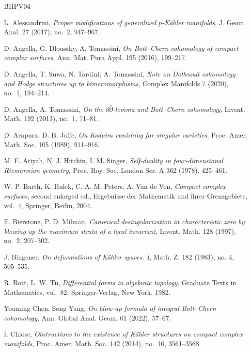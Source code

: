 \documentclass[11pt]{amsart}
\numberwithin{equation}{section}
\theoremstyle{plain}
\theoremstyle{definition}
\begin{document}
\begin{thebibliography}{BHPV04}

L. Alessandrini,
\textit{Proper modifications of generalized $p$-K\"ahler manifolds},
J. Geom. Anal. 27 (2017), no.~2, 947--967.

D. Angella, G. Dloussky, A. Tomassini,
\textit{On Bott--Chern cohomology of compact complex surfaces},
Ann. Mat. Pura Appl. 195 (2016), 199--217.

D. Angella, T. Suwa, N. Tardini, A. Tomassini,
\textit{Note on Dolbeault cohomology and Hodge structures up to
bimeromorphisms},
Complex Manifolds 7 (2020), no.~1, 194--214.

D. Angella, A. Tomassini,
\textit{On the $\partial\bar\partial$-lemma and Bott--Chern cohomology},
Invent. Math. 192 (2013), no.~1, 71--81.

D. Arapura, D. B. Jaffe,
\textit{On Kodaira vanishing for singular varieties},
Proc. Amer. Math. Soc. 105 (1989), 911--916.

M. F. Atiyah, N. J. Hitchin, I. M. Singer,
\textit{Self-duality in four-dimensional Riemannian geometry},
Proc. Roy. Soc. London Ser. A 362 (1978), 425--461.

W. P. Barth, K. Hulek, C. A. M. Peters, A. Van de Ven,
\textit{Compact complex surfaces}, second enlarged ed.,
Ergebnisse der Mathematik und ihrer Grenzgebiete, vol.~4,
Springer, Berlin, 2004.

E. Bierstone, P. D. Milman,
\textit{Canonical desingularization in characteristic zero by blowing up the
maximum strata of a local invariant},
Invent. Math. 128 (1997), no.~2, 207--302.

J. Bingener,
\textit{On deformations of K\"ahler spaces. I},
Math. Z. 182 (1983), no. 4, 505--535.

R. Bott, L. W. Tu,
\textit{Differential forms in algebraic topology},
Graduate Texts in Mathematics, vol.~82,
Springer-Verlag, New York, 1982.

%
Youming Chen, Song Yang,
\textit{On blow-up formula of integral Bott--Chern cohomology},
Ann. Global Anal. Geom. 61 (2022), 57--67.

I. Chiose,
\textit{Obstructions to the existence of K\"ahler structures on compact
complex manifolds},
Proc. Amer. Math. Soc. 142 (2014), no.~10, 3561--3568.




\end{thebibliography}
\end{document}
